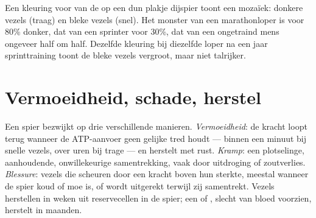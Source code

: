 \begin{example}\label{ex:g10:muscles-and-joints:biopsy}
Een kleuring voor  van de  op een dun plakje
dijspier toont een mozaïek: donkere vezels (traag) en bleke vezels
(snel). Het monster van een marathonloper is voor 80\% donker, dat van
een sprinter voor 30\%, dat van een ongetraind mens ongeveer half om
half. Dezelfde kleuring bij diezelfde loper na een jaar sprinttraining
toont de bleke vezels vergroot, maar niet talrijker.
\end{example}

\section{Vermoeidheid, schade, herstel}

\begin{proposition}\label{prop:g10:muscles-and-joints:limits}
Een spier bezwijkt op drie verschillende manieren.
\emph{Vermoeidheid}: de kracht loopt terug wanneer de ATP-aanvoer geen
gelijke tred houdt --- binnen een minuut bij snelle vezels, over uren bij
trage --- en herstelt met rust. \emph{Kramp}: een plotselinge,
aanhoudende, onwillekeurige samentrekking, vaak door uitdroging of
zoutverlies. \emph{Blessure}: vezels die scheuren door een kracht boven
hun sterkte, meestal wanneer de spier koud of moe is, of wordt uitgerekt
terwijl zij samentrekt. Vezels herstellen in weken uit reservecellen in
de spier; een  of , slecht van bloed voorzien, herstelt
in maanden.
\end{proposition}
\admitted


